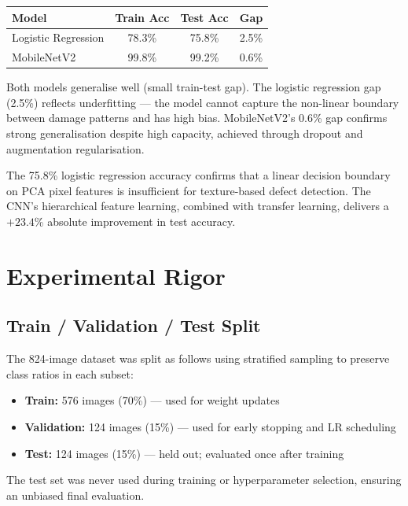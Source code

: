 \documentclass[10pt,twocolumn]{article}
\begin{document}
\begin{center}
\small
\begin{tabular}{lccc}
\toprule
\textbf{Model} & \textbf{Train Acc} & \textbf{Test Acc} & \textbf{Gap} \\
\midrule
Logistic Regression & 78.3\% & 75.8\% & 2.5\% \\
MobileNetV2         & 99.8\% & 99.2\% & 0.6\% \\
\bottomrule
\end{tabular}
\end{center}

Both models generalise well (small train-test gap). The logistic regression gap (2.5\%) reflects underfitting --- the model cannot capture the non-linear boundary between damage patterns and has high bias. MobileNetV2's 0.6\% gap confirms strong generalisation despite high capacity, achieved through dropout and augmentation regularisation.

The 75.8\% logistic regression accuracy confirms that a linear decision boundary on PCA pixel features is insufficient for texture-based defect detection. The CNN's hierarchical feature learning, combined with transfer learning, delivers a $+23.4$\% absolute improvement in test accuracy.

\section{Experimental Rigor}

\subsection*{Train / Validation / Test Split}

The 824-image dataset was split as follows using stratified sampling to preserve class ratios in each subset:

\begin{itemize}[noitemsep, topsep=2pt, leftmargin=*]
  \item \textbf{Train:} 576 images (70\%) --- used for weight updates
  \item \textbf{Validation:} 124 images (15\%) --- used for early stopping and LR scheduling
  \item \textbf{Test:} 124 images (15\%) --- held out; evaluated once after training
\end{itemize}

The test set was never used during training or hyperparameter selection, ensuring an unbiased final evaluation.
\end{document}
